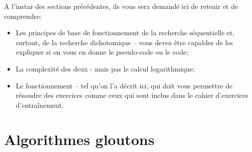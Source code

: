 \documentclass[12pt]{article}
\begin{document}
	\begin{MonRet}
		A l'instar des sections précédentes, ils vous sera demandé ici de retenir et de comprendre:
		\begin{itemize}
			\item Les principes de base de fonctionnement de la recherche séquentielle et, surtout, de la recherche dichotomique -- vous devez être capables de les expliquer si on vous en donne le pseudo-code ou le code;
			\item La complexité des deux - mais pas le calcul logarithmique;
			\item Le fonctionnement -- tel qu'on l'a décrit ici, qui doit vous permettre de résoudre des exercices comme ceux qui sont inclus dans le cahier d'exercices d'entraînement.
		\end{itemize}
		
		
	\end{MonRet}	
	\pagebreak
	
	\section{Algorithmes gloutons}
	
\end{document}
